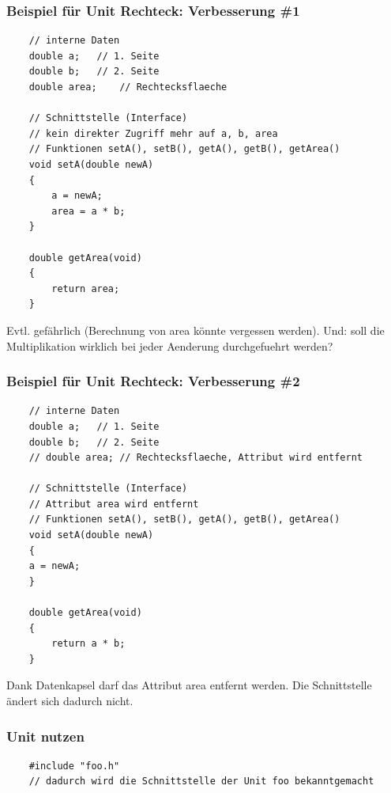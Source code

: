 \subsubsection{Beispiel für Unit Rechteck: Verbesserung \#1}
\label{sec:Beispiel fuer Unit Rechteck: Verbesserung 1}
\noindent
\begin{minipage}{\linewidth}
	\begin{lstlisting}
	// interne Daten
	double a;	// 1. Seite
	double b;	// 2. Seite
	double area;	// Rechtecksflaeche
	
	// Schnittstelle (Interface)
	// kein direkter Zugriff mehr auf a, b, area
	// Funktionen setA(), setB(), getA(), getB(), getArea()
	void setA(double newA)
	{
		a = newA;
		area = a * b;
	}
	
	double getArea(void)
	{
		return area;
	}
	\end{lstlisting}
\end{minipage}
\begin{hinweis}
	Evtl. gefährlich (Berechnung von area könnte vergessen werden). Und: soll die Multiplikation wirklich bei jeder Aenderung durchgefuehrt werden?
\end{hinweis}

\subsubsection{Beispiel für Unit Rechteck: Verbesserung \#2}
\label{sec:Beispiel fuer Unit Rechteck: Verbesserung 2}
\noindent
\begin{minipage}{\linewidth}
	\begin{lstlisting}
	// interne Daten
	double a;	// 1. Seite
	double b;	// 2. Seite
	// double area;	// Rechtecksflaeche, Attribut wird entfernt
	
	// Schnittstelle (Interface)
	// Attribut area wird entfernt
	// Funktionen setA(), setB(), getA(), getB(), getArea()
	void setA(double newA)
	{
	a = newA;
	}
	
	double getArea(void)
	{
		return a * b;
	}
	\end{lstlisting}
\end{minipage}
\begin{hinweis}
	Dank Datenkapsel darf das Attribut area entfernt werden. Die Schnittstelle ändert sich dadurch nicht.
\end{hinweis}

\subsubsection{Unit nutzen}
\label{sec:Unit nutzen}
\noindent
\begin{minipage}{\linewidth}
	\begin{lstlisting}
	#include "foo.h"
	// dadurch wird die Schnittstelle der Unit foo bekanntgemacht
	\end{lstlisting}
\end{minipage}

